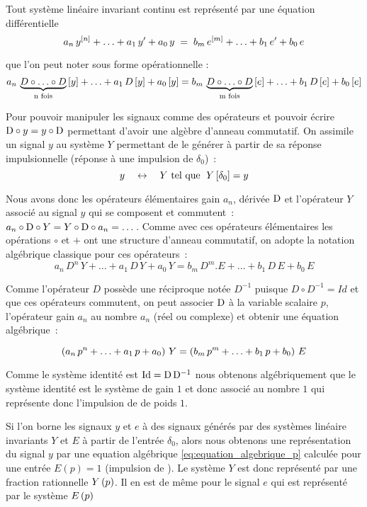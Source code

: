 Tout système linéaire invariant continu est représenté par une
équation différentielle
$$
a_n\,y^{\left[n\right]}+\ldots+a_1\,y'+a_0\,y \;=\; b_m\,e^{\left[m\right]} + \ldots +
b_1\,e' + b_0\,e
$$

que l'on peut noter sous forme opérationnelle :
$$
a_n\,\underbrace{D\circ\ldots\circ D}_{\text{n fois}}\left[y\right] + \ldots +a_1\,
D\left[y\right] + a_0\left[y\right] = b_m\,\underbrace{D\circ\ldots\circ D}_{\text{m
    fois}}\left[e\right] + \ldots +b_1\, D\left[e\right] + b_0\left[e\right]
$$

Pour pouvoir manipuler les signaux comme des opérateurs et pouvoir
écrire $\mathrm{D}\circ y= y\circ\mathrm{D}$ permettant d'avoir une algèbre
d'anneau commutatif. On assimile un signal $y$ au système $Y$
permettant de le générer à partir de sa réponse impulsionnelle
(réponse à une impulsion de \Dirac{} $\delta_0$)~:
$$
y \quad\leftrightarrow\quad Y \text{ tel que } \; Y\left[\delta_0\right]=y
$$

Nous avons donc les opérateurs élémentaires gain $a_n$, dérivée
$\mathrm{D}$ et l'opérateur $Y$ associé au signal $y$ qui se composent et
commutent~: $a_n\circ\mathrm{D}\circ Y = Y\circ\mathrm{D}\circ a_n =
\dots$. Comme avec ces opérateurs élémentaires les opérations $\circ$
et $+$ ont une structure d'anneau commutatif, on adopte la notation
algébrique classique pour ces opérateurs~:
$$
a_n\,D^n\,Y + \ldots +a_1\, D \, Y + a_0 \,Y = b_m\,D^m.E + \ldots
+b_1\, D\, E + b_0 \,E
$$

Comme l'opérateur $D$ possède une réciproque notée $D^{-1}$ puisque
$D\circ D^{-1}= Id$ et que ces opérateurs commutent, on peut associer
$\mathrm{D}$ à la variable scalaire $p$, l'opérateur gain $a_n$ au nombre
$a_n$ (réel ou complexe) et obtenir une équation algébrique~:

\begin{equation}
  \left(a_n\,p^n + \ldots +a_1\, p + a_0 \right)\, Y = \left(b_m\,p^m + \ldots +b_1\, p + b_0 \right)\,E
  \label{eq:equation_algebrique_p}
\end{equation}

Comme le système identité est $\mathrm{Id}=\mathrm{D}\,\mathrm{D}^{-1}$ nous obtenons
algébriquement que le système identité est le système de gain $1$ et
donc associé au nombre $1$ qui représente donc l'impulsion de \Dirac{}
de poids $1$.

Si l'on borne les signaux $y$ et $e$ à des signaux générés par des
systèmes linéaire invariants $Y$ et $E$ à partir de l'entrée
$\delta_0$, alors nous obtenons une représentation du signal $y$ par
une equation algébrique \eqref{eq:equation_algebrique_p} calculée pour
une entrée $E(p)=1$ (impulsion de \Dirac). Le système $Y$ est donc
représenté par une fraction rationnelle $Y\left(p\right)$. Il en est de même
pour le signal $e$ qui est représenté par le système $E\left(p\right)$


